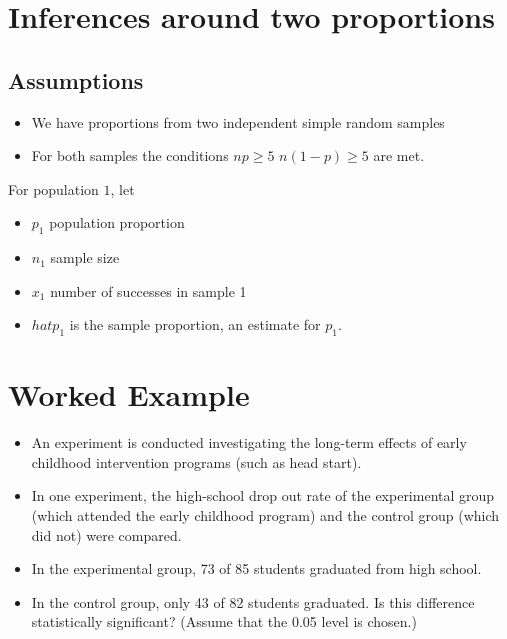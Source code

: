 \documentclass[a4paper,12pt]{article}
\begin{document}
\section*{Inferences around two proportions}


\subsection*{Assumptions}

\begin{itemize}
\item We have proportions from two independent simple random samples
\item For both samples the conditions $np \geq 5$ $ n(1-p) \geq 5$ are met.
\end{itemize}
For population $1$, let
\begin{itemize}
\item $p_1$  population proportion
\item $n_1$ sample size
\item $x_1$ number of successes in sample 1
\item $hat{p}_1$ is the sample proportion, an estimate for $p_1$.
\end{itemize}

\bigskip


\section*{Worked Example}
\begin{itemize}
\item An experiment is conducted investigating the long-term effects of early childhood intervention programs (such as head start).
\item In one experiment, the high-school drop out rate of the experimental group (which attended the early childhood program)
 and the control group (which did not) were compared.
\item In the experimental group, 73 of 85 students graduated from high school. \item In the control group, only 43 of 82 students graduated.
Is this difference statistically significant? (Assume that the 0.05 level is chosen.) \end{itemize}


\end{document}
